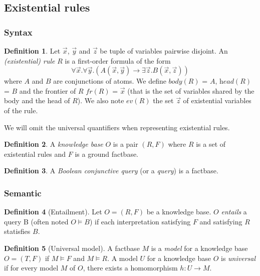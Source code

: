 \documentclass{article}
\theoremstyle{definition}
\newtheorem{definition}{Definition}[section]
\theoremstyle{remark}
\begin{document}
\subsection{Existential rules}

\subsubsection{Syntax}

\begin{definition}
Let $\vec x$, $\vec y$ and $\vec z$ be tuple of variables pairwise disjoint. An \emph{(existential) rule} $R$ is a first-order formula	of the form $$\forall \vec x.\forall \vec y.( A(\vec x,\vec y) \rightarrow \exists \vec z. B(\vec x,\vec z))$$ where $A$ and $B$ are conjunctions of atoms. We define \emph{$\textit{body}(R)$} = $A$, \emph{$\textit{head}(R)$} = $B$ and the frontier of $R$ \emph{$\textit{fr}(R)$} = $\vec x$ (that is the set of variables shared by the body and the head of $R$). We also note \emph{$\textit{ev}(R)$} the set $\vec{z}$ of existential variables of the rule.
\end{definition}
We will omit the universal quantifiers when representing existential rules.
\begin{definition}
A \emph{knowledge base} $O$ is a pair $(R,F)$ where $R$ is a set of existential rules and $F$ is a  ground factbase.
\end{definition}

\begin{definition}
A \emph{Boolean conjunctive query} (or a \emph{query}) is a factbase.
\end{definition}

\subsubsection{Semantic}

\begin{definition}[Entailment]
Let $O=(R,F)$ be a knowledge base. $O$ \emph{entails} a query B (often noted $O \models B$) if each interpretation satisfying $F$ and satisfying $R$ statisfies $B$.
\end{definition}

\begin{definition}[Universal model]
A factbase $M$ is a \emph{model} for a knowledge base $O = (T,F)$ if $M \models F$ and $M \models R$.  A model $U$ for a knowledge base $O$ is \emph{universal} if for
every model $M$ of $O$, there exists a homomorphism $h : U \to M$.
\end{definition}
\end{document}
